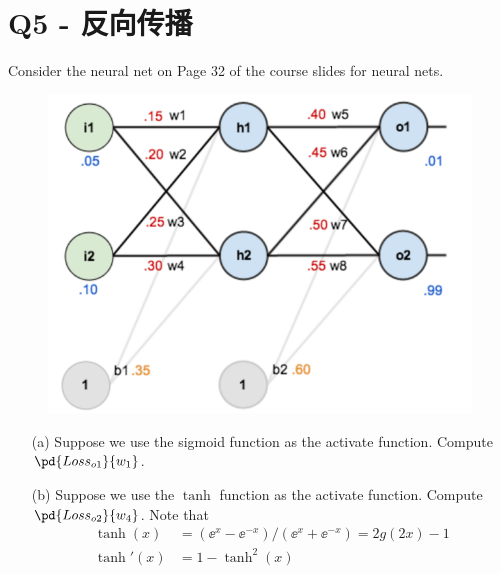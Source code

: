 \documentclass[a4paper, 11pt]{article}
\begin{document}
\begin{flushleft}
\end{flushleft}

\newpage
\section{Q5 - 反向传播}
\begin{question}\normalfont
Consider the neural net on Page 32 of the course slides for neural nets.
\begin{figure}[H]
\centering
\includegraphics[width=0.5\linewidth]{fig/neural_net.png}
\end{figure}
\begin{itemize}
\item[(a)] Suppose we use the sigmoid function as the activate function. Compute $\pd{Loss_{o1}}{w_1}$.
\item[(b)] Suppose we use the $\tanh$ function as the activate function. Compute $\pd{Loss_{o2}}{w_4}$. Note that
\[\begin{aligned}
    \tanh(x) &= (\ee^x - \ee^{-x})/(\ee^x + \ee^{-x}) = 2g(2x) - 1\\
    \tanh'(x) &= 1 - \tanh^2(x)
\end{aligned}\]
\end{itemize}
\end{question}
\end{document}
